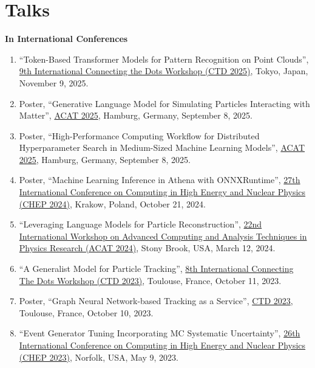 
\section*{Talks}

\textbf{In International Conferences}
\begin{enumerate}
    \item ``Token-Based Transformer Models for Pattern Recognition on Point Clouds'', \href{https://indico.cern.ch/event/1499357/contributions/6621916/}{9th International Connecting the Dots Workshop (CTD 2025)}, Tokyo, Japan, November 9, 2025.

    \item Poster, ``Generative Language Model for Simulating Particles Interacting with Matter'', \href{https://indico.cern.ch/event/1488410/contributions/6561402/}{ACAT 2025}, Hamburg, Germany, September 8, 2025.

    \item Poster, ``High-Performance Computing Workflow for Distributed Hyperparameter Search in Medium-Sized Machine Learning Models'', \href{https://indico.cern.ch/event/1488410/contributions/6562845/}{ACAT 2025}, Hamburg, Germany, September 8, 2025.

    \item Poster, ``Machine Learning Inference in Athena with ONNXRuntime'', \href{https://indico.cern.ch/event/1338689/contributions/6010565/}{27th International Conference on Computing in High Energy and Nuclear Physics (CHEP 2024)}, Krakow, Poland, October 21, 2024.

    \item ``Leveraging Language Models for Particle Reconstruction'', \href{https://indico.cern.ch/event/1330797/contributions/5796831/}{22nd International Workshop on Advanced Computing and Analysis Techniques in Physics Research (ACAT 2024)}, Stony Brook, USA, March 12, 2024.

    \item ``A Generalist Model for Particle Tracking'', \href{https://indico.cern.ch/event/1252748/contributions/5521536}{8th International Connecting The Dots Workshop (CTD 2023)}, Toulouse, France, October 11, 2023.

    \item Poster, ``Graph Neural Network-based Tracking as a Service'', \href{https://indico.cern.ch/event/1252748/contributions/5521548}{CTD 2023}, Toulouse, France, October 10, 2023.

    \item ``Event Generator Tuning Incorporating MC Systematic Uncertainty'', \href{https://indico.jlab.org/event/459/contributions/11602/}{26th International Conference on Computing in High Energy and Nuclear Physics (CHEP 2023)}, Norfolk, USA, May 9, 2023.


\end{enumerate}
